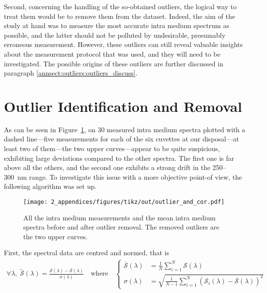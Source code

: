 Second, concerning the handling of the so-obtained outliers, the logical way to treat them would be to remove them from the dataset. Indeed, the aim of the study at hand was to measure the most accurate intra medium spectrum as possible, and the latter should not be polluted by undesirable, presumably erroneous measurement. However, these outliers can still reveal valuable insights about the measurement protocol that was used, and they will need to be investigated. The possible origins of these outliers are further discussed in paragraph \ref{annsect:outliers:outliers_discuss}.

\section{Outlier Identification and Removal}\label{par:outliers_id}

As can be seen in Figure~\ref{annfig:outlier:outlier_and_cor}, on 30 measured intra medium spectra plotted with a dashed line---five measurements for each of the six cuvettes at our disposal---at least two of them---the two upper curves---appear to be quite suspicious, exhibiting large deviations compared to the other spectra. The first one is far above all the others, and the second one exhibits a strong drift in the 250--300~nm range. To investigate this issue with a more objective point-of view, the following algorithm was set up.

\begin{figure}
	\centering
	\texttt{[image: 2\_appendices/figures/tikz/out/outlier\_and\_cor.pdf]}
	\caption[Intra medium measurements and mean spectra before and after outlier removal.]{All the intra medium measurements and the mean intra medium spectra before and after outlier removal. The removed outliers are the two upper curves.}
	\label{annfig:outlier:outlier_and_cor}
\end{figure}

First, the spectral data are centred and normed, that is
\begin{equation}
	\begin{split}
		\forall \lambda,\; \widetilde{\mathcal{S}}(\lambda) = \frac{\mathcal{S}(\lambda) - \overline{\mathcal{S}}(\lambda)}{\sigma(\lambda)} \quad
		\text{where}\quad
		\begin{cases}
			\overline{\mathcal{S}}(\lambda)& = \frac{1}{N} \sum_{i=1}^{N} \mathcal{S}(\lambda)\\
			\sigma(\lambda)& = \sqrt{\frac{1}{N-1}\sum_{i=1}^{N} (\mathcal{S}_{i}(\lambda) - \overline{\mathcal{S}}(\lambda))^2}
		\end{cases}
	\end{split}
\end{equation}

